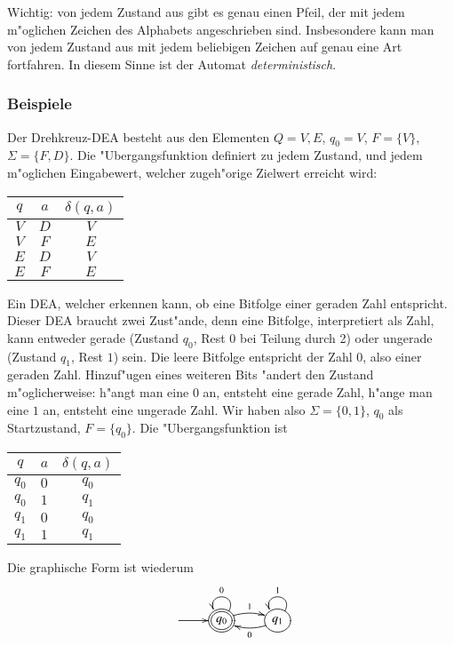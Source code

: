 Wichtig: von jedem Zustand aus gibt es genau einen Pfeil, der mit jedem m"oglichen
Zeichen des Alphabets angeschrieben sind. Insbesondere kann man von jedem
Zustand aus mit jedem beliebigen Zeichen auf genau eine Art fortfahren.
In diesem Sinne ist der Automat {\em deterministisch}.

\subsubsection{Beispiele}
\begin{beispiel}[\bf Drehkreuz]
Der Drehkreuz-DEA besteht aus den Elementen $Q={V,E}$, $q_0=V$,
$F=\{V\}$, $\Sigma=\{F,D\}$.
Die "Ubergangsfunktion definiert zu jedem Zustand, und jedem m"oglichen
Eingabewert, welcher zugeh"orige Zielwert erreicht wird:
\begin{center}
\begin{tabular}{|cc|c|}
\hline
$q$&$a$&$\delta(q,a)$\\
\hline
$V$&$D$&$V$\\
$V$&$F$&$E$\\
$E$&$D$&$V$\\
$E$&$F$&$E$\\
\hline
\end{tabular}
\end{center}
\end{beispiel}
\begin{beispiel}
Ein DEA, welcher erkennen kann, ob eine Bitfolge einer geraden Zahl entspricht.
Dieser DEA braucht zwei Zust"ande, denn eine Bitfolge, interpretiert
als Zahl, kann entweder gerade (Zustand $q_0$, Rest $0$ bei Teilung durch 2)
oder ungerade (Zustand $q_1$, Rest $1$) sein. Die leere
Bitfolge entspricht der Zahl $0$, also einer geraden Zahl.
Hinzuf"ugen eines weiteren
Bits "andert den Zustand m"oglicherweise: h"angt man eine $0$ an, entsteht
eine gerade Zahl, h"ange man eine $1$ an, entsteht eine ungerade Zahl.
Wir haben also $\Sigma=\{0,1\}$, $q_0$ als Startzustand,  $F=\{q_0\}$. Die
"Ubergangsfunktion ist
\begin{center}
\begin{tabular}{|cc|c|}
\hline
$q$&$a$&$\delta(q,a)$\\
\hline
$q_0$&$0$&$q_0$\\
$q_0$&$1$&$q_1$\\
$q_1$&$0$&$q_0$\\
$q_1$&$1$&$q_1$\\
\hline
\end{tabular}
\end{center}
Die graphische Form ist wiederum
\[
\entrymodifiers={++[o][F]}
\xymatrix{
*+\txt{}\ar[r]
	&*++[o][F=]{q_0} \ar@/^/[r]^1 \ar@(ur,ul)_0
		&{q_1} \ar@/^/[l]^0 \ar@(ur,ul)_1
}
\]
\end{beispiel}
